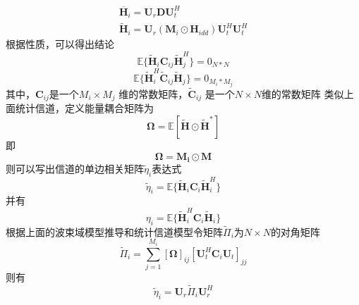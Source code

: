 \documentclass[bachelor,nocolorlinks, printoneside]{seuthesis} %
\begin{document}
\begin{Main}
\begin{gather}
\overline{\mathbf{H}}_i = \mathbf{U}_{r}\mathbf{D}\mathbf{U}_{t}^{H} \\
\tilde{\mathbf{H}}_i = \mathbf{U}_{r}(\mathbf{M}_i\odot \mathbf{H}_{idd})\mathbf{U}_{t}^{H}\mathbf{U}_{t}^{H}
\end{gather}
根据性质，可以得出结论
\begin{equation}\label{key}
\mathbb{E} \lbrace \tilde{\mathbf{H}}_i \mathbf{C}_{ij} \tilde{\mathbf{H}}_j^{H} \rbrace = 0_{N*N}
\end{equation}
\begin{equation}\label{key}
\mathbb{E} \lbrace \tilde{\mathbf{H}}_i^{H} \tilde{\mathbf{C}}_{ij} \tilde{\mathbf{H}}_j \rbrace = 0_{M_i*M_j}
\end{equation}
其中，$\mathbf{C}_{ij}$是一个$M_i \times M_j$ 维的常数矩阵，$\tilde{\mathbf{C}}_{ij}$ 是一个$N \times N$维的常数矩阵
类似上面统计信道，定义能量耦合矩阵为
\begin{equation}\label{key}
\bm{\Omega} =\mathbb{E}[\tilde{\mathbf{H}} \odot \tilde{\mathbf{H}}^{*}]
\end{equation}
即
\begin{equation}\label{key}
\bm{\Omega} =\mathbf{M_i} \odot \mathbf{M}
\end{equation}
则可以写出信道的单边相关矩阵$\tilde{\eta}_i$表达式
\begin{equation}\label{key}
\tilde{\eta}_i = \mathbb{E} \lbrace \tilde{\mathbf{H}}_i \mathbf{C}_i \tilde{\mathbf{H}}_i^H \rbrace
\end{equation}
并有
\begin{equation}\label{key}
{\eta}_i = \mathbb{E} \lbrace \tilde{\mathbf{H}}_i^H \mathbf{C}_i \tilde{\mathbf{H}}_i \rbrace
\end{equation}
根据上面的波束域模型推导和统计信道模型令矩阵$\tilde{\Pi}_i$为$N \times N$的对角矩阵
\begin{equation}\label{key}
\tilde{\Pi}_i = \sum_{j=1}^{M_i}[\bm{\Omega}]_{ij}  [\mathbf{U}_t^H \mathbf{C}_i \mathbf{U}_t]_{jj}
\end{equation}
则有
\begin{equation}\label{key}
\tilde{\eta}_i = \mathbf{U}_r \tilde{\Pi}_i \mathbf{U}_r^H
\end{equation}




\end{Main}
\end{document}
